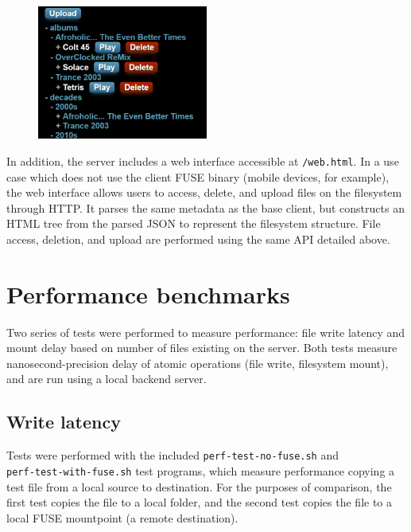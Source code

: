 \documentclass{article}
\begin{document}
	\begin{figure}
		\centering
		\vspace{-0.025\textheight}
		\includegraphics[width=0.5\textwidth]{web-screenshot}
		
	\end{figure}
	In addition, the server includes a web interface accessible at \texttt{/web.html}. In a use case which does not use the client FUSE binary (mobile devices, for example), the web interface allows users to access, delete, and upload files on the filesystem through HTTP.  It parses the same metadata as the base client, but constructs an HTML tree from the parsed JSON to represent the filesystem structure. File access, deletion, and upload are performed using the same API detailed above.

	\pagebreak \restoregeometry
	
	\section{Performance benchmarks} 
	Two series of tests were performed to measure performance: file write latency and mount delay based on number of files existing on the server. Both tests measure nanosecond-precision delay of atomic operations (file write, filesystem mount), and are run using a local backend server.
	
	\subsection{Write latency}
	Tests were performed with the included \texttt{perf-test-no-fuse.sh} and \\ \texttt{perf-test-with-fuse.sh} test programs, which measure performance copying a test file from a local source to destination. For the purposes of comparison, the first test copies the file to a local folder, and the second test copies the file to a local FUSE mountpoint (a remote destination). \\
	
\end{document}

